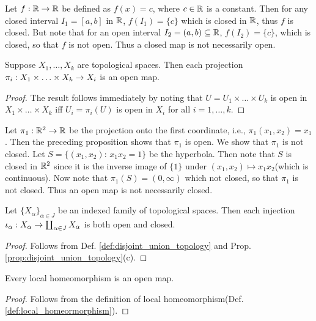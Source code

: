 \documentclass[11pt,a4paper]{article}
\begin{document}
\begin{example}
Let $f:\mathbb{R}\rightarrow \mathbb{R}$ be defined as $f(x) = c$, where $c\in \mathbb{R}$ is a constant. Then for any closed interval $I_1 = [a,b]$ in $\mathbb{R}$, $f(I_1) = \{c\}$ which is closed in $\mathbb{R}$, thus $f$ is closed. But note that for an open interval $I_2 = (a,b)\subseteq \mathbb{R}$, $f(I_2) = \{c\}$, which is closed, so that $f$ is not open. Thus a closed map is not necessarily open.
\end{example}

\begin{prop}
Suppose $X_1,\ldots,X_k$ are topological spaces. Then each projection $\pi_i:X_1\times\ldots\times X_k\rightarrow X_i$ is an open map.
\end{prop}

\begin{proof}
The result follows immediately by noting that $U = U_1\times\ldots\times U_k$ is open in $X_1\times\ldots\times X_k$ iff $U_i = \pi_i(U)$ is open in $X_i$ for all $i = 1,\ldots,k$.
\end{proof}

\begin{example}
Let $\pi_1:\mathbb{R}^2\rightarrow \mathbb{R}$ be the projection onto the first coordinate, i.e., $\pi_1(x_1,x_2) = x_1$. Then the preceding proposition shows that $\pi_1$ is open. We show that $\pi_1$ is not closed. Let $S = \{(x_1,x_2):\,x_1 x_2 = 1\}$ be the hyperbola. Then note that $S$ is closed in $\mathbb{R}^2$ since it is the inverse image of $\{1\}$ under $(x_1,x_2)\mapsto x_1x_2$(which is continuous). Now note that $\pi_1(S) = (0,\infty)$ which not closed, so that $\pi_1$ is not closed. Thus an open map is not necessarily closed.
\end{example}

\begin{prop}
Let $\{X_\alpha\}_{\alpha\in J}$ be an indexed family of topological spaces. Then each injection $\iota_\alpha:X_\alpha\rightarrow \coprod_{\alpha\in J}X_\alpha$ is both open and closed.
\end{prop}

\begin{proof}
Follows from Def. \ref{def:disjoint_union_topology} and Prop. \ref{prop:disjoint_union_topology}(c).
\end{proof}

\begin{prop}
Every local homeomorphism is an open map.
\end{prop}

\begin{proof}
Follows from the definition of local homeomorphism(Def. \ref{def:local_homeormorphism}).
\end{proof}
\end{document}
